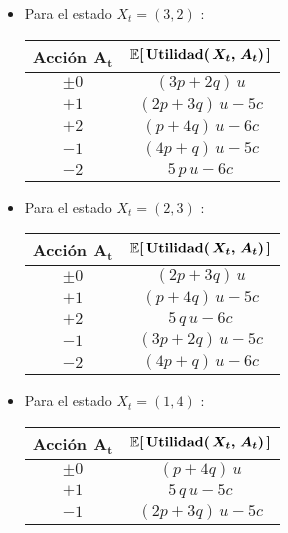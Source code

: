 \documentclass[ a4paper, twoside, 11pt]{article}
\begin{document}
\begin{problem}
\begin{itemize}
\begin{table}[H]
\end{table}
\item Para el estado $X_t = (3,2)$ :
\begin{table}[H]
\centering
\begin{tabular}{|c|c|}
\hline
\textbf{Acci\'on} $\boldsymbol{A_t}$
& $\boldsymbol{ \mathbb{E}[ \, \textbf{Utilidad}( \, X_t, \, A_t ) \, ]}$ \\ \hline
$\pm 0$ & $( 3p + 2q ) \, u$ \\ \hline
$+1$ & $( 2p + 3q ) \, u - 5c$ \\ \hline
$+2$ & $( p + 4q ) \, u - 6c$ \\ \hline
$-1$ & $( 4p + q ) \, u - 5c$ \\ \hline
$-2$ & $5 \, p \, u - 6c$ \\ \hline
\end{tabular}
\end{table}
\item Para el estado $X_t = (2,3)$ :
\begin{table}[H]
\centering
\begin{tabular}{|c|c|}
\hline
\textbf{Acci\'on} $\boldsymbol{A_t}$
& $\boldsymbol{ \mathbb{E}[ \, \textbf{Utilidad}( \, X_t, \, A_t ) \, ]}$ \\ \hline
$\pm 0$ & $( 2p + 3q ) \, u$ \\ \hline
$+1$ & $( p + 4q ) \, u - 5c$ \\ \hline
$+2$ & $5 \, q \, u - 6c$ \\ \hline
$-1$ & $( 3p + 2q ) \, u - 5c$ \\ \hline
$-2$ & $( 4p + q ) \, u - 6c$ \\ \hline
\end{tabular}
\end{table}
\item Para el estado $X_t = (1,4)$ :
\begin{table}[H]
\centering
\begin{tabular}{|c|c|}
\hline
\textbf{Acci\'on} $\boldsymbol{A_t}$
& $\boldsymbol{ \mathbb{E}[ \, \textbf{Utilidad}( \, X_t, \, A_t ) \, ]}$ \\ \hline
$\pm 0$ & $( p + 4q ) \, u$ \\ \hline
$+1$ & $5 \, q \, u - 5c$ \\ \hline
$-1$ & $( 2p + 3q ) \, u - 5c$ \\ \hline

\end{tabular}
\end{table}
\end{itemize}
\end{problem}
\end{document}
